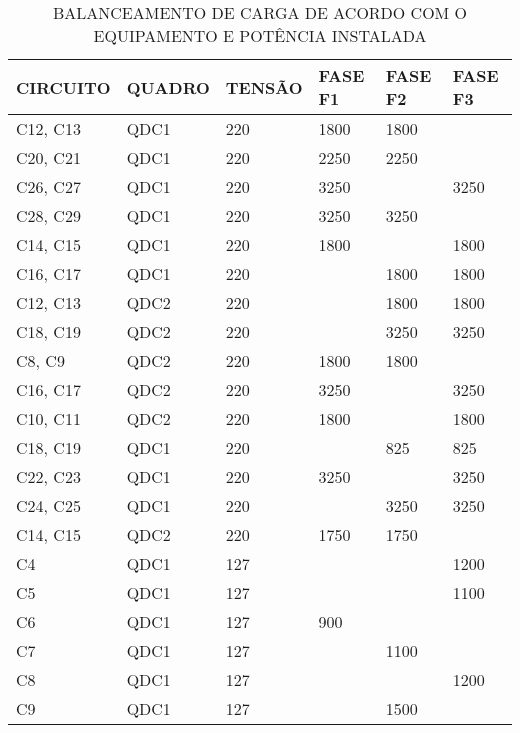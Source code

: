 \begin{longtable}{|l|l|l|l|l|l|}
	\caption{BALANCEAMENTO DE CARGA DE ACORDO COM O EQUIPAMENTO E POTÊNCIA INSTALADA}
	\label{tab:balanceamento_de_carga}\\
	\hline
	CIRCUITO & QUADRO & TENSÃO & FASE F1 & FASE F2 & FASE F3 \\ \hline
	\endfirsthead
	\endhead
	C12, C13 & QDC1   & 220    & 1800    & 1800    &         \\ \hline
	C20, C21 & QDC1   & 220    & 2250    & 2250    &         \\ \hline
	C26, C27 & QDC1   & 220    & 3250    &         & 3250    \\ \hline
	C28, C29 & QDC1   & 220    & 3250    & 3250    &         \\ \hline
	C14, C15 & QDC1   & 220    & 1800    &         & 1800    \\ \hline
	C16, C17 & QDC1   & 220    &         & 1800    & 1800    \\ \hline
	C12, C13 & QDC2   & 220    &         & 1800    & 1800    \\ \hline
	C18, C19 & QDC2   & 220    &         & 3250    & 3250    \\ \hline
	C8, C9   & QDC2   & 220    & 1800    & 1800    &         \\ \hline
	C16, C17 & QDC2   & 220    & 3250    &         & 3250    \\ \hline
	C10, C11 & QDC2   & 220    & 1800    &         & 1800    \\ \hline
	C18, C19 & QDC1   & 220    &         & 825     & 825     \\ \hline
	C22, C23 & QDC1   & 220    & 3250    &         & 3250    \\ \hline
	C24, C25 & QDC1   & 220    &         & 3250    & 3250    \\ \hline
	C14, C15 & QDC2   & 220    & 1750    & 1750    &         \\ \hline
	C4       & QDC1   & 127    &         &         & 1200    \\ \hline
	C5       & QDC1   & 127    &         &         & 1100    \\ \hline
	C6       & QDC1   & 127    & 900     &         &         \\ \hline
	C7       & QDC1   & 127    &         & 1100    &         \\ \hline
	C8       & QDC1   & 127    &         &         & 1200    \\ \hline
	C9       & QDC1   & 127    &         & 1500    &         \\ \hline

\end{longtable}
